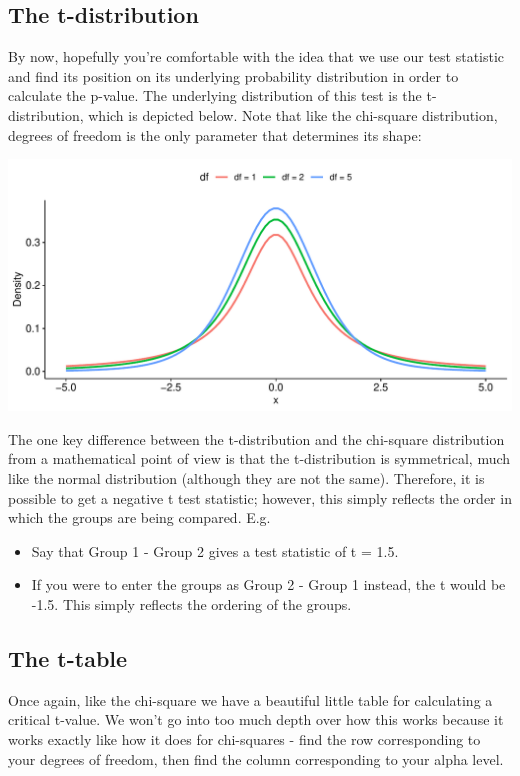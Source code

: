 \documentclass[
]{book}
\providecommand{\tightlist}{%
  \setlength{\itemsep}{0pt}\setlength{\parskip}{0pt}}
\begin{document}
\subsection{The t-distribution}\label{the-t-distribution}

By now, hopefully you're comfortable with the idea that we use our test statistic and find its position on its underlying probability distribution in order to calculate the p-value. The underlying distribution of this test is the t-distribution, which is depicted below. Note that like the chi-square distribution, degrees of freedom is the only parameter that determines its shape:

\includegraphics{_main_files/figure-latex/unnamed-chunk-131-1.pdf}

The one key difference between the t-distribution and the chi-square distribution from a mathematical point of view is that the t-distribution is symmetrical, much like the normal distribution (although they are not the same). Therefore, it is possible to get a negative t test statistic; however, this simply reflects the order in which the groups are being compared. E.g.

\begin{itemize}
\tightlist
\item
  Say that Group 1 - Group 2 gives a test statistic of t = 1.5.
\item
  If you were to enter the groups as Group 2 - Group 1 instead, the t would be -1.5. This simply reflects the ordering of the groups.
\end{itemize}

\subsection{The t-table}\label{the-t-table}

Once again, like the chi-square we have a beautiful little table for calculating a critical t-value. We won't go into too much depth over how this works because it works exactly like how it does for chi-squares - find the row corresponding to your degrees of freedom, then find the column corresponding to your alpha level.
\end{document}
